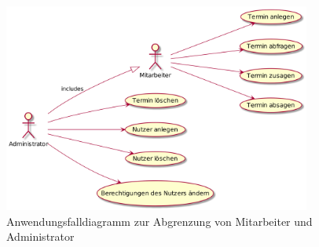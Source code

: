 \begin{figure}[htbp]
    \includegraphics[width=0.9\textwidth]{../docs/uml/usecase-berechtigung.png}
    \caption{Anwendungsfalldiagramm zur Abgrenzung von Mitarbeiter und Administrator}
    \label{img:usecase-berechtigung}
\end{figure}
